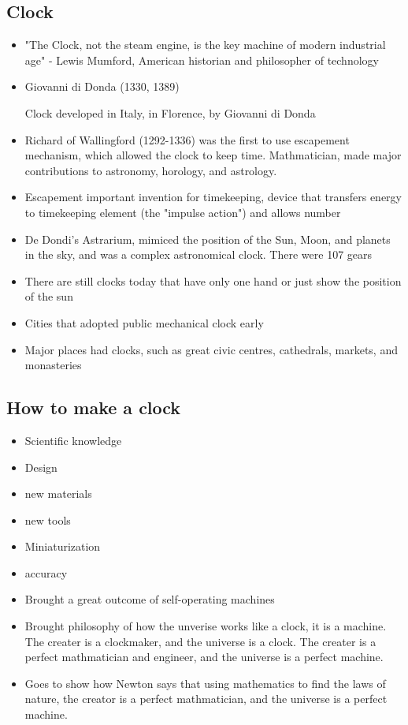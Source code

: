 \documentclass{article}
\begin{document}
\subsection{Clock}
\begin{itemize}
  \item "The Clock, not the steam engine, is the key machine of modern industrial age"
    - Lewis Mumford, American historian and philosopher of technology
  \item Giovanni di Donda (1330, 1389)

    Clock developed in Italy, in Florence, by Giovanni di Donda
  \item Richard of Wallingford (1292-1336) was the first to use
    escapement mechanism, which allowed the clock to keep time.
    Mathmatician, made major contributions to astronomy, horology, and astrology.
  \item Escapement important invention for timekeeping, device that transfers energy
    to timekeeping element (the "impulse action") and allows number
  \item De Dondi's Astrarium, mimiced the position of the Sun, Moon, and planets
    in the sky, and was a complex astronomical clock. There were 107 gears
  \item There are still clocks today that have only one hand or just show the position of the sun
  \item Cities that adopted public mechanical clock early
  \item Major places had clocks, such as great civic centres, cathedrals, markets, and monasteries
\end{itemize}

\subsection{How to make a clock}
\begin{itemize}
  \item Scientific knowledge
  \item Design
  \item new materials
  \item new tools
  \item Miniaturization
  \item accuracy
  \item Brought a great outcome of self-operating machines
  \item Brought philosophy of how the unverise works like a clock, it is
    a machine. The creater is a clockmaker, and the universe is a clock.
    The creater is a perfect mathmatician and engineer, and the universe is a perfect machine.
  \item Goes to show how Newton says that using mathematics to find the laws of
    nature, the creator is a perfect mathmatician, and the universe is a perfect machine.
\end{itemize}
\end{document}
